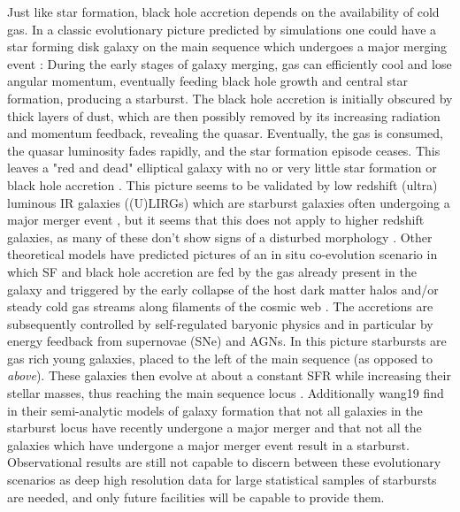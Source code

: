     Just like star formation, black hole accretion depends on the availability of cold gas. 
    In a classic evolutionary picture predicted by simulations one could have a star forming disk galaxy on the main sequence which undergoes a major merging event \citep{2005Natur.433..604D, 2008ApJS..175..356H}: During the early stages of galaxy merging, gas can efficiently cool and lose angular momentum, eventually feeding black hole growth and central star formation, producing a starburst. The black hole accretion is initially obscured by thick layers of dust, which are then possibly removed by its increasing radiation and momentum feedback, revealing the quasar. Eventually, the gas is consumed, the quasar luminosity fades rapidly, and the star formation episode ceases. This leaves a "red and dead" elliptical galaxy with no or very little star formation or black hole accretion \citep{2004ApJ...600..580G, 2006ApJ...650...42L}. This picture seems to be validated by low redshift (ultra) luminous IR galaxies ((U)LIRGs) which are starburst galaxies often undergoing a major merger event \citep{1996ARA&A..34..749S}, but it seems that this does not apply to higher redshift galaxies, as many of these don't show signs of a disturbed morphology \citep{2007A&A...468...33E, 2019ApJ...877L..38R}. 
    Other theoretical models have predicted pictures of an in situ co-evolution scenario in which SF and black hole accretion are fed by the gas already present in the galaxy and triggered by the early collapse of the host dark matter halos  \citep[e.g.][]{2006ApJ...650...42L, 2011ApJ...742...24L, 2014ApJ...782...69L, 2013ApJ...772..119L,2015ApJ...810...74A, 2016ApJ...833..152M} and/or steady cold gas streams along filaments of the cosmic web  \citep[e.g.][]{2009Natur.457..451D, 2011ApJ...741L..33B}. The accretions are subsequently controlled by self-regulated baryonic physics and in particular by energy feedback from supernovae (SNe) and AGNs. In this picture starbursts are gas rich young galaxies, placed to the left of the main sequence (as opposed to \textit{above}). These galaxies then evolve at about a constant SFR while increasing their stellar masses, thus reaching the main sequence locus \citep{2016ApJ...833..152M, 2018ApJ...857...22L}. Additionally wang19 \citet{2019MNRAS.482.4454W} find in their semi-analytic models of galaxy formation that not all galaxies in the starburst locus have recently undergone a major merger and that not all the galaxies which have undergone a major merger event result in a starburst.
    Observational results are still not capable to discern between these evolutionary scenarios as deep high resolution data for large statistical samples of starbursts are needed, and only future facilities will be capable to provide them. %
    
